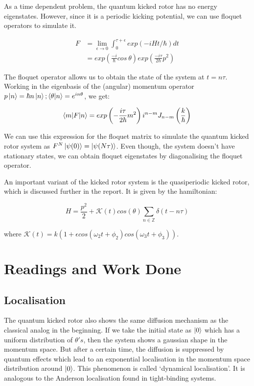 \documentclass[twocolumn,nobalancelastpage]{report}
\begin{document}
As a time dependent problem, the quantum kicked rotor has no energy eigenstates.
However, since it is a periodic kicking potential, we can use floquet operators
to simulate it.

\begin{align}
    F &= \lim_{\epsilon \to 0} \int_{0}^{\tau + \epsilon} exp(-iHt/\hbar) dt\\
    &= exp\left(\frac{-i}{\hbar} cos\ \theta\right)
    exp\left(\frac{-i\tau}{2\hbar}p^2\right)
\end{align}

The floquet operator allows us to obtain the state of the system at $t = n\tau$.
Working in the eigenbasis of the (angular) momentum operator
$p \ket{n} = \hbar n \ket{n}; \braket{\theta | n} = e^{in\theta}$, we get:

\begin{equation}
    \braket{m | F | n} = exp\left(-\frac{i \tau}{2\hbar}m^2\right) i^{n-m}
    J_{n-m}\left(\frac{k}{\hbar}\right)
\end{equation}

We can use this expression for the floquet matrix to simulate the quantum
kicked rotor system as $F^N \ket{\psi(0)} = \ket{\psi(N\tau)}$. Even though,
the system doesn't have stationary states, we can obtain floquet eigenstates
by diagonalising the floquet operator.

An important variant of the kicked rotor system is the quasiperiodic kicked
rotor, which is discussed further in the report. It is given by the
hamiltonian:

\begin{equation}
H = \frac{p^2}{2} + \mathcal{K}(t) cos(\theta)\sum_{n \in \mathbb{Z}}
\delta(t - n\tau)
\end{equation}

where $\mathcal{K}(t) = k(1 + \epsilon cos(\omega_2 t + \phi_2)
cos(\omega_3 t + \phi_3))$.

\chapter{Readings and Work Done}
\section{Localisation}
The quantum kicked rotor also shows the same diffusion mechanism as the
classical analog in the beginning. If we take the initial state as $\ket{0}$
which has a uniform distribution of $\theta's$, then the system shows a
gaussian shape in the momentum space. But after a certain time, the
diffusion is suppressed by quantum effects which lead to an exponential
localisation in the momentum space distribution around $\ket{0}$. This
phenomenon is called `dynamical localisation'. It is analogous to the
Anderson localisation found in tight-binding systems.
\end{document}
